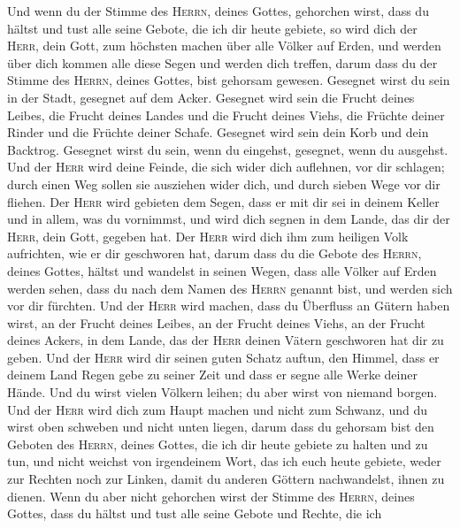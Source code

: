  Und wenn du der Stimme des \textsc{Herrn}, deines Gottes,
gehorchen wirst, dass du hältst und tust alle seine Gebote, die ich dir
heute gebiete, so wird dich der \textsc{Herr}, dein Gott, zum höchsten
machen über alle Völker auf Erden,  und werden über dich
kommen alle diese Segen und werden dich treffen, darum dass du der
Stimme des \textsc{Herrn}, deines Gottes, bist gehorsam gewesen.
 Gesegnet wirst du sein in der Stadt, gesegnet auf dem
Acker.  Gesegnet wird sein die Frucht deines Leibes, die
Frucht deines Landes und die Frucht deines Viehs, die Früchte deiner
Rinder und die Früchte deiner Schafe.  Gesegnet wird sein
dein Korb und dein Backtrog.  Gesegnet wirst du sein, wenn
du eingehst, gesegnet, wenn du ausgehst.  Und der
\textsc{Herr} wird deine Feinde, die sich wider dich auflehnen, vor dir
schlagen; durch einen Weg sollen sie ausziehen wider dich, und durch
sieben Wege vor dir fliehen.  Der \textsc{Herr} wird
gebieten dem Segen, dass er mit dir sei in deinem Keller und in allem,
was du vornimmst, und wird dich segnen in dem Lande, das dir der
\textsc{Herr}, dein Gott, gegeben hat.  Der \textsc{Herr}
wird dich ihm zum heiligen Volk aufrichten, wie er dir geschworen hat,
darum dass du die Gebote des \textsc{Herrn}, deines Gottes, hältst und
wandelst in seinen Wegen,  dass alle Völker auf Erden
werden sehen, dass du nach dem Namen des \textsc{Herrn} genannt bist,
und werden sich vor dir fürchten.  Und der \textsc{Herr}
wird machen, dass du Überfluss an Gütern haben wirst, an der Frucht
deines Leibes, an der Frucht deines Viehs, an der Frucht deines Ackers,
in dem Lande, das der \textsc{Herr} deinen Vätern geschworen hat dir zu
geben.  Und der \textsc{Herr} wird dir seinen guten
Schatz auftun, den Himmel, dass er deinem Land Regen gebe zu seiner Zeit
und dass er segne alle Werke deiner Hände. Und du wirst vielen Völkern
leihen; du aber wirst von niemand borgen.  Und der
\textsc{Herr} wird dich zum Haupt machen und nicht zum Schwanz, und du
wirst oben schweben und nicht unten liegen, darum dass du gehorsam bist
den Geboten des \textsc{Herrn}, deines Gottes, die ich dir heute gebiete
zu halten und zu tun,  und nicht weichst von irgendeinem
Wort, das ich euch heute gebiete, weder zur Rechten noch zur Linken,
damit du anderen Göttern nachwandelst, ihnen zu dienen. 
Wenn du aber nicht gehorchen wirst der Stimme des \textsc{Herrn}, deines
Gottes, dass du hältst und tust alle seine Gebote und Rechte, die ich
